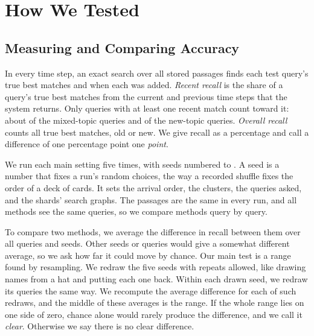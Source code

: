 \section{How We Tested}
\label{sec:setup}

\subsection{Measuring and Comparing Accuracy}
\label{sec:stats}

In every time step, an exact search over all stored passages finds each test query's true \RNumPlainTopK{} best matches and when each was added.
\emph{Recent recall} is the share of a query's true best matches from the current and previous time steps that the system returns.
Only queries with at least one recent match count toward it: about \RNumPlainQueriesWithRecentPctSteady{} of the mixed-topic queries and \RNumPlainQueriesWithRecentPctNewTopic{} of the new-topic queries.
\emph{Overall recall} counts all \RNumPlainTopK{} true best matches, old or new.
We give recall as a percentage and call a difference of one percentage point one \emph{point}.

We run each main setting five times, with seeds numbered \RNumSeedMin{} to \RNumSeedMax{}.
A seed is a number that fixes a run's random choices, the way a recorded shuffle fixes the order of a deck of cards.
It sets the arrival order, the clusters, the queries asked, and the shards' search graphs.
The passages are the same in every run, and all methods see the same queries, so we compare methods query by query.

To compare two methods, we average the difference in recall between them over all queries and seeds.
Other seeds or queries would give a somewhat different average, so we ask how far it could move by chance.
Our main test is a \RNumCIPct{} range found by resampling.
We redraw the five seeds with repeats allowed, like drawing names from a hat and putting each one back.
Within each drawn seed, we redraw its queries the same way.
We recompute the average difference for each of \RNumPlainBootReps{} such redraws, and the middle \RNumCIPct{} of these averages is the range.
If the whole range lies on one side of zero, chance alone would rarely produce the difference, and we call it \emph{clear}.
Otherwise we say there is no clear difference.

